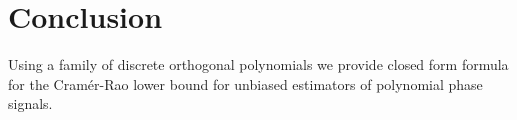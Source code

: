 \documentclass[journal,10pt]{IEEEtran}
\begin{document}



 
\section{Conclusion}

Using a family of discrete orthogonal polynomials we provide closed form formula for the Cram\'{e}r-Rao lower bound for unbiased estimators of polynomial phase signals.


%
\small 

 
 
\end{document}
